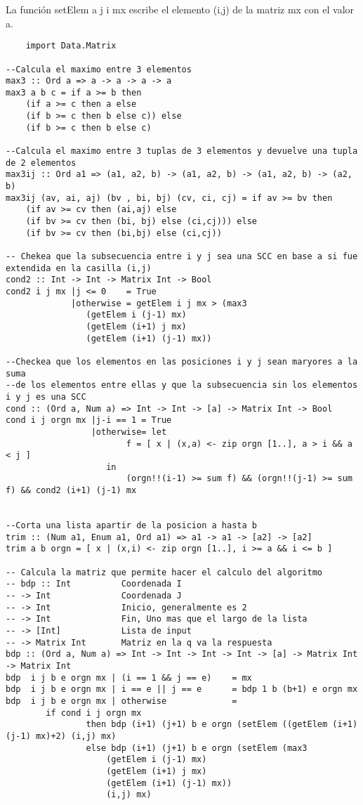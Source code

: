 \documentclass[10pt]{article}
\begin{document}
	La funci\'on setElem a j i mx escribe el elemento (i,j) de la matriz mx con el valor a.\\
		\begin{verbatim}
	import Data.Matrix

--Calcula el maximo entre 3 elementos
max3 :: Ord a => a -> a -> a -> a  
max3 a b c = if a >= b then 
    (if a >= c then a else 
    (if b >= c then b else c)) else 
    (if b >= c then b else c)

--Calcula el maximo entre 3 tuplas de 3 elementos y devuelve una tupla de 2 elementos
max3ij :: Ord a1 => (a1, a2, b) -> (a1, a2, b) -> (a1, a2, b) -> (a2, b)
max3ij (av, ai, aj) (bv , bi, bj) (cv, ci, cj) = if av >= bv then 
    (if av >= cv then (ai,aj) else 
    (if bv >= cv then (bi, bj) else (ci,cj))) else 
    (if bv >= cv then (bi,bj) else (ci,cj))

-- Chekea que la subsecuencia entre i y j sea una SCC en base a si fue extendida en la casilla (i,j)
cond2 :: Int -> Int -> Matrix Int -> Bool
cond2 i j mx |j <= 0    = True
             |otherwise = getElem i j mx > (max3 
                (getElem i (j-1) mx) 
                (getElem (i+1) j mx) 
                (getElem (i+1) (j-1) mx)) 

--Checkea que los elementos en las posiciones i y j sean maryores a la suma 
--de los elementos entre ellas y que la subsecuencia sin los elementos i y j es una SCC
cond :: (Ord a, Num a) => Int -> Int -> [a] -> Matrix Int -> Bool
cond i j orgn mx |j-i == 1 = True
                 |otherwise= let
                        f = [ x | (x,a) <- zip orgn [1..], a > i && a < j ]
                    in
                        (orgn!!(i-1) >= sum f) && (orgn!!(j-1) >= sum f) && cond2 (i+1) (j-1) mx
                 

--Corta una lista apartir de la posicion a hasta b
trim :: (Num a1, Enum a1, Ord a1) => a1 -> a1 -> [a2] -> [a2]
trim a b orgn = [ x | (x,i) <- zip orgn [1..], i >= a && i <= b ]

-- Calcula la matriz que permite hacer el calculo del algoritmo
-- bdp :: Int          Coordenada I
-- -> Int              Coordenada J
-- -> Int              Inicio, generalmente es 2
-- -> Int              Fin, Uno mas que el largo de la lista
-- -> [Int]            Lista de input
-- -> Matrix Int       Matriz en la q va la respuesta
bdp :: (Ord a, Num a) => Int -> Int -> Int -> Int -> [a] -> Matrix Int -> Matrix Int
bdp  i j b e orgn mx | (i == 1 && j == e)    = mx
bdp  i j b e orgn mx | i == e || j == e      = bdp 1 b (b+1) e orgn mx
bdp  i j b e orgn mx | otherwise             =
        if cond i j orgn mx
                then bdp (i+1) (j+1) b e orgn (setElem ((getElem (i+1) (j-1) mx)+2) (i,j) mx)
                else bdp (i+1) (j+1) b e orgn (setElem (max3
                    (getElem i (j-1) mx) 
                    (getElem (i+1) j mx) 
                    (getElem (i+1) (j-1) mx)) 
                    (i,j) mx)
        


\end{verbatim}
\end{document}
